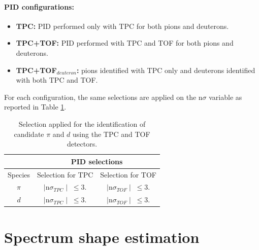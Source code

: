 \paragraph{PID configurations:}
\begin{itemize}
\item \textbf{TPC:} PID performed only with TPC for both pions and deuterons.
\item \textbf{TPC+TOF:} PID performed with TPC and TOF for both pions and deuterons.
\item \textbf{TPC+TOF$_{deuteron}$:} pions identified with TPC only and deuterons
identified with both TPC and TOF.
\end{itemize}

For each configuration, the same selections are applied on the n$\sigma$ variable as reported in
Table \ref{tab:pid_config}.

\begingroup
\renewcommand{\arraystretch}{1.5} %
\begin{table}
\centering
\begin{tabular}{ccc}
    & \multicolumn{2}{c}{\textbf{PID selections}}  \\%
\toprule
Species & Selection for TPC & Selection for TOF   \\
\hline
$\pi$ & $\mid\mathrm{n}\sigma_{TPC}\mid\; \leq 3.$  & $\mid\mathrm{n}\sigma_{TOF}\mid\; \leq 3.$ \\

$d$   & $\mid\mathrm{n}\sigma_{TPC}\mid\; \leq 3.$  & $\mid\mathrm{n}\sigma_{TOF}\mid\; \leq 3.$ \\
\midrule
\end{tabular}
\caption{Selection applied for the identification of candidate $\pi$ and $d$ using the TPC and TOF detectors.}
\label{tab:pid_config}
\end{table}
\endgroup


%
%
\section{Spectrum shape estimation} \label{sec:spectrum}


